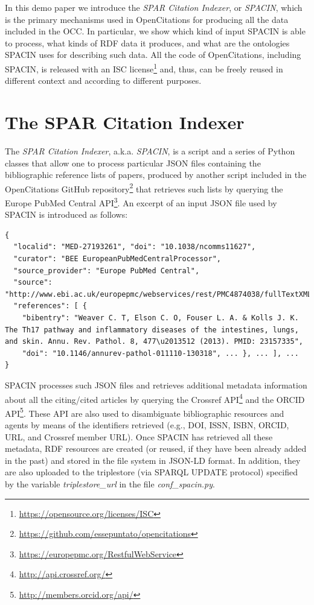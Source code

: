 \documentclass[runningheads,a4paper]{llncs}
\begin{document}
In this demo paper we introduce the {\em SPAR Citation Indexer}, or {\em SPACIN}, which is the primary mechanisms used in OpenCitations for producing all the data included in the OCC. In particular, we show which kind of input SPACIN is able to process, what kinds of RDF data it produces, and what are the ontologies SPACIN uses for describing such data. All the code of OpenCitations, including SPACIN, is released with an ISC license\footnote{\url{https://opensource.org/licenses/ISC}} and, thus, can be freely reused in different context and according to different purposes.

\section{The SPAR Citation Indexer}

The {\em SPAR Citation Indexer}, a.k.a. {\em SPACIN}, is a script and a series of Python classes that allow one to process particular JSON files containing the bibliographic reference lists of papers, produced by another script included in the OpenCitations GitHub repository\footnote{\url{https://github.com/essepuntato/opencitations}} that retrieves such lists by querying the Europe PubMed Central API\footnote{\url{https://europepmc.org/RestfulWebService}}. An excerpt of an input JSON file used by SPACIN is introduced as follows:

\begin{lstlisting}[mathescape]
{
  "localid": "MED-27193261", "doi": "10.1038/ncomms11627", 
  "curator": "BEE EuropeanPubMedCentralProcessor", 
  "source_provider": "Europe PubMed Central", 
  "source": "http://www.ebi.ac.uk/europepmc/webservices/rest/PMC4874038/fullTextXML", 
  "references": [ {
    "bibentry": "Weaver C. T, Elson C. O, Fouser L. A. & Kolls J. K. The Th17 pathway and inflammatory diseases of the intestines, lungs, and skin. Annu. Rev. Pathol. 8, 477\u2013512 (2013). PMID: 23157335", 
    "doi": "10.1146/annurev-pathol-011110-130318", ... }, ... ], ... 
}
\end{lstlisting}

SPACIN processes such JSON files and retrieves additional metadata information about all the citing/cited articles by querying the Crossref API\footnote{\url{http://api.crossref.org/}} and the ORCID API\footnote{\url{http://members.orcid.org/api/}}. These API are also used to disambiguate bibliographic resources and agents by means of the identifiers retrieved (e.g., DOI, ISSN, ISBN, ORCID, URL, and Crossref member URL). Once SPACIN has retrieved all these metadata, RDF resources are created (or reused, if they have been already added in the past) and stored in the file system in JSON-LD format. In addition, they are also uploaded to the triplestore (via SPARQL UPDATE protocol) specified by the variable {\em triplestore\_url} in the file {\em conf\_spacin.py}.
\end{document}
